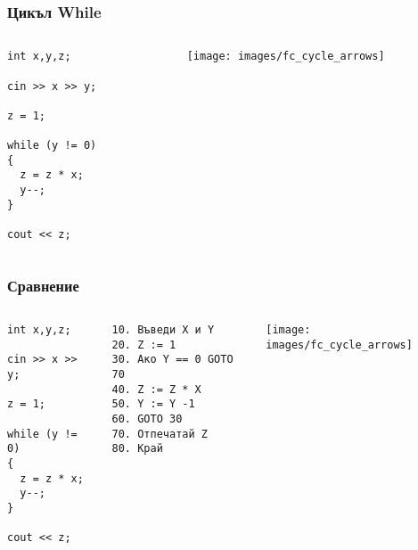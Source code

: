 \documentclass{beamer}
\begin{document}
\begin{frame}[fragile]
\frametitle{Цикъл While}


\begin{columns}[t]
  \begin{column}{0.3\textwidth}
\begin{lstlisting}
int x,y,z;

cin >> x >> y;

z = 1;

while (y != 0)
{
  z = z * x;
  y--;
}

cout << z;

\end{lstlisting}

  \end{column}
  \begin{column}{0.7\textwidth}

\hspace*{-90pt}
\texttt{[image: images/fc\_cycle\_arrows]} 


  \end{column}
\end{columns}


\end{frame}


\begin{frame}[fragile]
\frametitle{Сравнение}


\begin{columns}[t]
  \begin{column}{0.25\textwidth}
\begin{lstlisting}
int x,y,z;

cin >> x >> y;

z = 1;

while (y != 0)
{
  z = z * x;
  y--;
}

cout << z;

\end{lstlisting}


  \end{column}
  \begin{column}{0.25\textwidth}


\begin{verbatim}
10. Въведи X и Y
20. Z := 1
30. Ако Y == 0 GOTO 70
40. Z := Z * X
50. Y := Y -1
60. GOTO 30
70. Отпечатай Z
80. Край   
\end{verbatim}

  \end{column}
  \begin{column}{0.5\textwidth}

\hspace*{-70pt}
\texttt{[image: images/fc\_cycle\_arrows]} 


  \end{column}
\end{columns}


\end{frame}
\end{document}

